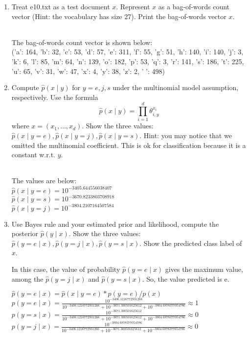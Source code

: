 \documentclass[a4paper]{article}
\theoremstyle{definition}
\newenvironment{soln}{
    \leavevmode\color{blue}\ignorespaces
}{}
\begin{document}
\begin{enumerate}
\begin{soln}
\end{soln}

\item
Treat e10.txt as a test document $x$.
Represent $x$ as a bag-of-words count vector (Hint: the vocabulary has size 27).
Print the bag-of-words vector $x$.
\begin{soln}
	\\The bag-of-words count vector is shown below:
	\\('a': 164, 'b': 32, 'c': 53, 'd': 57, 'e': 311, 'f': 55, 'g': 51, 'h': 140, 'i': 140, 'j': 3, 'k': 6, 'l': 85, 'm': 64, 'n': 139, 'o': 182, 'p': 53, 'q': 3, 'r': 141, 's': 186, 't': 225, 'u': 65, 'v': 31, 'w': 47, 'x': 4, 'y': 38, 'z': 2, ' ': 498)
	
\end{soln}

\item
Compute $\hat p(x \mid y)$ for $y=e, j, s$ under the multinomial model assumption, respectively.
Use the formula
$$\hat p(x \mid y) = \prod_{i=1}^d \theta_{i, y}^{x_i}$$
where $x=(x_1, \ldots, x_d)$.
Show the three values: $\hat p(x \mid y=e), \hat p(x \mid y=j), \hat p(x \mid y=s)$.
Hint: you may notice that we omitted the multinomial coefficient.  This is ok for classification because it is a constant w.r.t. $y$.
\begin{soln}
\\The values are below:
\\$\hat p(x \mid y=e)  = 10^{-3405.644556038407}$
\\$\hat p(x \mid y=s)  = 10^{-3670.8233803708918}$
\\$\hat p(x \mid y=j)  = 10^{-3804.2107164507584}$
	
\end{soln}

\item
Use Bayes rule and your estimated prior and likelihood, compute the posterior $\hat p(y \mid x)$.
Show the three values: $\hat p(y=e \mid x), \hat p(y=j \mid x), \hat p(y=s \mid x)$.
Show the predicted class label of $x$.
\begin{soln}
	
	In this case, the value of probability $\hat p(y=e \mid x)$ gives the maximum value, among the $\hat p(y=j \mid x)$  and $\hat p(y=s \mid x)$. So, the value predicted is e. 

	$\hat p(y=e \mid x) = \hat p(x \mid y=e)*p(y=e)/p(x)$
	\\$p(y=e \mid x) = \frac{10^{-3406.1216772931266}}{10^{-3406.1216772931266}+10^{-3671.300501625612}+10^{-3804.6878377054786}} \approx 1$
	\\$p(y=s \mid x) = \frac{10^{-3671.300501625612}}{10^{-3406.1216772931266}+10^{-3671.300501625612}+10^{-3804.6878377054786}} \approx 0$
	\\$p(y=j \mid x) = \frac{10^{-3804.6878377054786}}{10^{-3406.1216772931266}+10^{-3671.300501625612}+10^{-3804.6878377054786}} \approx 0$\\
\end{soln}


\end{enumerate}
\end{document}
